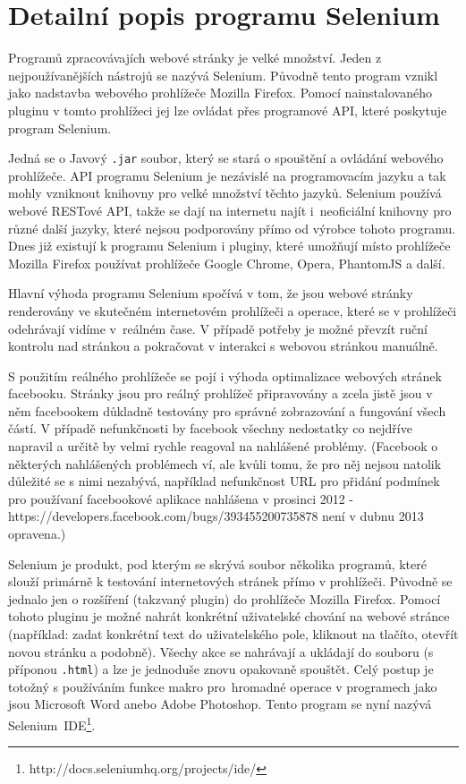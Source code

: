 \documentclass[thesis=M,czech]{FITthesis}[2013/05/10]
\begin{document}
\section{Detailní popis programu Selenium}

Programů zpracovávajích webové stránky je velké množství. Jeden z nejpoužívanějších nástrojů se nazývá Selenium. Původně tento program vznikl jako nadstavba webového prohlížeče Mozilla Firefox. Pomocí nainstalovaného pluginu v tomto prohlížeci jej lze ovládat přes programové API, které poskytuje program Selenium. 

Jedná se o Javový \verb|.jar| soubor, který se stará o spouštění a ovládání webového prohlížeče. API programu Selenium je nezávislé na programovacím jazyku a tak mohly vzniknout knihovny pro velké množství těchto jazyků. Selenium používá webové RESTové API, takže se dají na internetu najít i~neoficiální knihovny pro různé další jazyky, které nejsou podporovány přímo od výrobce tohoto programu. Dnes již existují k programu Selenium i pluginy, které umožňují místo prohlížeče Mozilla Firefox používat prohlížeče Google Chrome, Opera, PhantomJS a další.

Hlavní výhoda programu Selenium spočívá v tom, že jsou webové stránky renderovány ve skutečném internetovém prohlížeči a operace, které se v prohlížeči odehrávají vidíme v~reálném čase. V případě potřeby je možné převzít ruční kontrolu nad stránkou a pokračovat v interakci s webovou stránkou manuálně. 

S použitím reálného prohlížeče se pojí i výhoda optimalizace webových stránek facebooku. Stránky jsou pro reálný prohlížeč připravovány a zcela jistě jsou v něm facebookem důkladně testovány pro správné 
zobrazování a fungování všech částí. V případě nefunkčnosti by facebook všechny nedostatky co nejdříve napravil a určitě by velmi rychle reagoval na nahlášené problémy. (Facebook o některých nahlášených problémech ví, ale kvůli tomu, že pro něj nejsou natolik důležité se s nimi nezabývá, například nefunkčnost URL pro přidání podmínek pro používaní facebookové aplikace  nahlášena v prosinci 2012 - https://developers.facebook.com/bugs/393455200735878  není v dubnu 2013 opravena.) 

Selenium je produkt, pod kterým se skrývá soubor několika programů, které slouží primárně k testování internetových stránek přímo v prohlížeči. Původně se jednalo jen o rozšíření (takzvaný plugin) do prohlížeče Mozilla Firefox. Pomocí tohoto pluginu je možné nahrát konkrétní uživatelské chování na webové stránce (například: zadat konkrétní text do uživatelského pole, kliknout na tlačíto, otevřít novou stránku a podobně). Všechy akce se nahrávají a ukládají do souboru (s příponou \verb|.html|) a lze je jednoduše znovu opakovaně spouštět. Celý postup je totožný s používáním funkce makro pro~hromadné operace v programech jako jsou Microsoft Word anebo Adobe Photoshop. Tento program se nyní nazývá Selenium~IDE\footnote{http://docs.seleniumhq.org/projects/ide/}.
\end{document}
